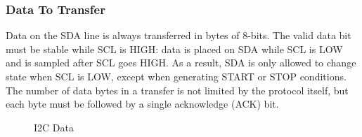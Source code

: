 \subsubsection{Data To Transfer}
\label{chap:Back_I2C_Protocol_Data}

Data on the SDA line is always transferred in bytes of 8-bits. The valid data bit 
must be stable while SCL is HIGH: data is placed on SDA while SCL is LOW 
and is sampled after SCL goes HIGH. As a result, SDA is only allowed to change 
state when SCL is LOW, except when generating START or STOP conditions. The 
number of data bytes in a transfer is not limited by the protocol itself, but each 
byte must be followed by a single acknowledge (ACK) bit.

\begin{figure}[H]
    \centering
    \caption{I2C Data}
    \label{fig:i2c_data}
\end{figure}